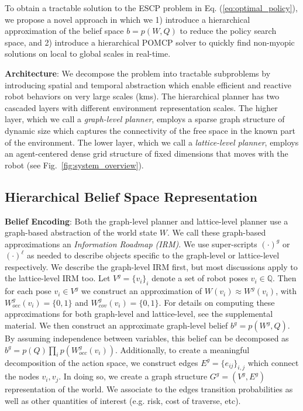 \documentclass[letterpaper]{article} %
\newcommand{\ph}[1]{{\textbf{#1}:}} %
\begin{document}

To obtain a tractable solution to the ESCP problem in Eq. (\ref{eq:optimal_policy}), we propose a novel approach in which we 1) introduce a hierarchical approximation of the belief space $b=p(W,Q)$ to reduce the policy search space, and 2) introduce a hierarchical POMCP solver to quickly find non-myopic solutions on local to global scales in real-time.

\ph{Architecture}  We decompose the problem into tractable subproblems by introducing spatial and temporal abstraction which enable efficient and reactive robot behaviors on very large scales (kms).  The hierarchical planner has two cascaded layers with different environment representation scales. The higher layer, which we call a \emph{graph-level planner}, employs a sparse graph structure of dynamic size which captures the connectivity of the free space in the known part of the environment. The lower layer, which we call a \emph{lattice-level planner}, employs an agent-centered dense grid structure of fixed dimensions that moves with the robot (see Fig.~\ref{fig:system_overview}). %

\subsection{Hierarchical Belief Space Representation} 

\ph{Belief Encoding} Both the graph-level planner and lattice-level planner use a graph-based abstraction of the world state $W$.  We call these graph-based approximations an \textit{Information Roadmap (IRM)}. %
We use super-scripts $(\cdot)^g$ or $(\cdot)^\ell$ as needed to describe objects specific to the graph-level or lattice-level respectively. We describe the graph-level IRM first, but most discussions apply to the lattice-level IRM too. Let $V^g=\{v_i\}_i$ denote a set of robot poses $v_i\in \mathbb{Q}$.  Then for each pose $v_i\in V^g$ we construct an approximation of $W(v_i) \approx W^g(v_i)$, with $W_{occ}^g(v_i) = \{0,1\}$ and $W_{cov}^g(v_i) = \{0,1\}$.  %
For details on computing these approximations for both graph-level and lattice-level, see the supplemental material.  We then construct an approximate graph-level belief $b^g=p(W^g, Q)$.  By assuming independence between variables, this belief can be decomposed as $b^g=p(Q)\prod_i p(W_{occ}^g(v_i))$.  Additionally, to create a meaningful decomposition of the action space, we construct edges $E^g=\{e_{ij}\}_{i,j}$ which connect the nodes $v_i, v_j$.  In doing so, we create a graph structure $G^g=(V^g, E^g)$ representation of the world.  We associate to the edges transition probabilities as well as other quantities of interest (e.g. risk, cost of traverse, etc).
\end{document}
